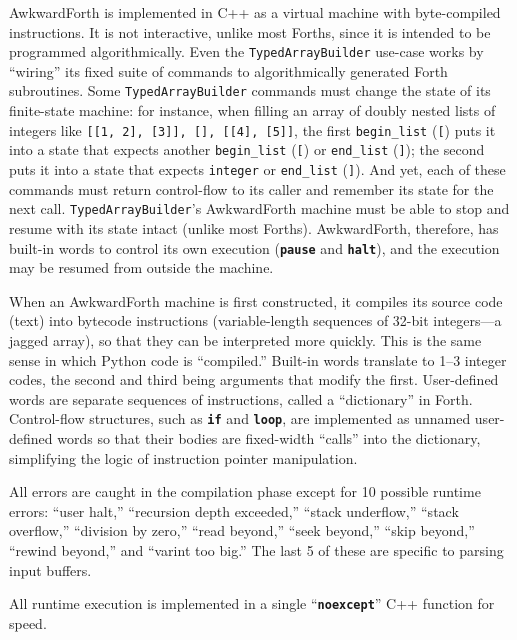 \documentclass{webofc}
\begin{document}
\vspace{-0.25 cm}
AwkwardForth is implemented in C++ as a virtual machine with byte-compiled instructions. It is not interactive, unlike most Forths, since it is intended to be programmed algorithmically. Even the {\tt TypedArrayBuilder} use-case works by ``wiring'' its fixed suite of commands to algorithmically generated Forth subroutines. Some {\tt TypedArrayBuilder} commands must change the state of its finite-state machine: for instance, when filling an array of doubly nested lists of integers like {\tt [[1,\,2],\,[3]],\,[],\,[[4],\,[5]]}, the first {\tt begin\_list} ({\tt [}) puts it into a state that expects another {\tt begin\_list} ({\tt [}) or {\tt end\_list} ({\tt ]}); the second puts it into a state that expects {\tt integer} or {\tt end\_list} ({\tt ]}). And yet, each of these commands must return control-flow to its caller and remember its state for the next call. {\tt TypedArrayBuilder}'s AwkwardForth machine must be able to stop and resume with its state intact (unlike most Forths). AwkwardForth, therefore, has built-in words to control its own execution (\textcolor{OliveGreen}{\tt\textbf{pause}} and \textcolor{OliveGreen}{\tt\textbf{halt}}), and the execution may be resumed from outside the machine.

When an AwkwardForth machine is first constructed, it compiles its source code (text) into bytecode instructions (variable-length sequences of 32-bit integers---a jagged array), so that they can be interpreted more quickly. This is the same sense in which Python code is ``compiled.'' Built-in words translate to 1--3 integer codes, the second and third being arguments that modify the first. User-defined words are separate sequences of instructions, called a ``dictionary'' in Forth. Control-flow structures, such as \textcolor{OliveGreen}{\tt\textbf{if}} and \textcolor{OliveGreen}{\tt\textbf{loop}}, are implemented as unnamed user-defined words so that their bodies are fixed-width ``calls'' into the dictionary, simplifying the logic of instruction pointer manipulation.

All errors are caught in the compilation phase except for 10 possible runtime errors: ``user halt,'' ``recursion depth exceeded,'' ``stack underflow,'' ``stack overflow,'' ``division by zero,'' ``read beyond,'' ``seek beyond,'' ``skip beyond,'' ``rewind beyond,'' and ``varint too big.'' The last 5 of these are specific to parsing input buffers.

All runtime execution is implemented in a single ``\textcolor{OliveGreen}{\tt\textbf{noexcept}}'' C++ function for speed.
\end{document}
